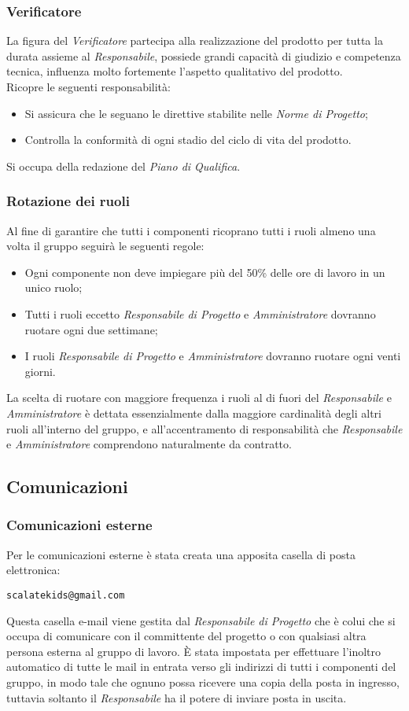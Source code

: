 \documentclass{scalatekids-article}
\begin{document}
\subsubsection{Verificatore}
La figura del \textit{Verificatore} partecipa alla realizzazione del prodotto per
tutta la durata assieme al \textit{Responsabile}, possiede grandi capacità di
giudizio e competenza tecnica, influenza molto fortemente l'aspetto qualitativo
del prodotto.\\ Ricopre le seguenti responsabilità:
\begin{itemize}
\item Si assicura che le  seguano le direttive stabilite nelle \textit{Norme di Progetto};
\item Controlla la conformità di ogni stadio del ciclo di vita del prodotto.
\end{itemize}
Si occupa della redazione del \textit{Piano di Qualifica}.
\subsubsection{Rotazione dei ruoli}
Al fine di garantire che tutti i componenti ricoprano tutti i ruoli almeno una volta il gruppo seguirà le seguenti regole:
\begin{itemize}
\item Ogni componente non deve impiegare più del 50\% delle ore di lavoro in un unico ruolo;
\item Tutti i ruoli eccetto \textit{Responsabile di Progetto} e \textit{Amministratore} dovranno ruotare ogni due settimane;
\item I ruoli \textit{Responsabile di Progetto} e \textit{Amministratore} dovranno ruotare ogni venti giorni.
\end{itemize}
La scelta di ruotare con maggiore frequenza i ruoli al di fuori del
\textit{Responsabile} e \textit{Amministratore} è dettata essenzialmente dalla
maggiore cardinalità degli altri ruoli all'interno del gruppo, e
all'accentramento di responsabilità che \textit{Responsabile} e
\textit{Amministratore} comprendono naturalmente da contratto.
\subsection{Comunicazioni}
\subsubsection{Comunicazioni esterne}
Per le comunicazioni esterne è stata creata una apposita casella di posta elettronica:
\begin{center}
  \verb=scalatekids@gmail.com=
\end{center}
Questa casella e-mail viene gestita dal \textit{Responsabile di Progetto} che è
colui che si occupa di comunicare con il committente del progetto o con
qualsiasi altra persona esterna al gruppo di lavoro. È stata impostata per
effettuare l'inoltro automatico di tutte le mail in entrata verso gli indirizzi
di tutti i componenti del gruppo, in modo tale che ognuno possa ricevere una
copia della posta in ingresso, tuttavia soltanto il \textit{Responsabile} ha il
potere di inviare posta in uscita.
\end{document}
